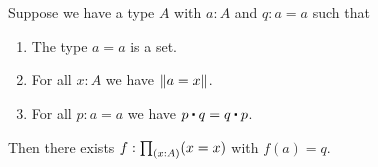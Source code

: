 \documentclass[hott-all.tex]{subfiles}
\begin{document}
\begin{lem}\label{lem:autohtpy}
  Suppose we have a type $A$ with $a:A$ and $q:a=a$ such that
  \begin{enumerate}
  \item The type $a=a$ is a set.\label{item:autohtpy1}
  \item For all $x:A$ we have $\mathopen{}\left\Vert a=x\right\Vert_{}\mathclose{}$.\label{item:autohtpy2}
  \item For all $p:a=a$ we have $p\ct q = q \ct p$.\label{item:autohtpy3}
  \end{enumerate}
  Then there exists $f:\prd{x:A} (x=x)$ with $f(a)=q$.
\end{lem}
%
%
\end{document}
